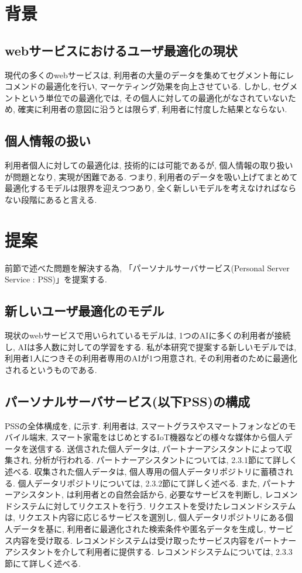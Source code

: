 \documentclass[a4j,twocolumn]{jsarticle}
\begin{document}
 
\twocolumn[\makeHeader]

\section{背景}
\subsection{webサービスにおけるユーザ最適化の現状}
現代の多くのwebサービスは, 利用者の大量のデータを集めてセグメント毎にレコメンドの最適化を行い, マーケティング効果を向上させている.
しかし, セグメントという単位での最適化では, その個人に対しての最適化がなされていないため, 確実に利用者の意図に沿うとは限らず, 利用者に忖度した結果とならない.

\subsection{個人情報の扱い}
利用者個人に対しての最適化は, 技術的には可能であるが, 個人情報の取り扱いが問題となり, 実現が困難である.
つまり, 利用者のデータを吸い上げてまとめて最適化するモデルは限界を迎えつつあり, 全く新しいモデルを考えなければならない段階にあると言える.


\section{提案}
前節で述べた問題を解決する為, 「パーソナルサーバサービス(Personal Server Service : PSS)」を提案する.

\subsection{新しいユーザ最適化のモデル} 
現状のwebサービスで用いられているモデルは, 1つのAIに多くの利用者が接続し, AIは多人数に対しての学習をする.
私が本研究で提案する新しいモデルでは, 利用者1人につきその利用者専用のAIが1つ用意され, その利用者のために最適化されるというものである.

\subsection{パーソナルサーバサービス(以下PSS)の構成}
PSSの全体構成を, に示す.
利用者は, スマートグラスやスマートフォンなどのモバイル端末, スマート家電をはじめとするIoT機器などの様々な媒体から個人データを送信する.
送信された個人データは, パートナーアシスタントによって収集され, 分析が行われる. パートナーアシスタントについては, 2.3.1節にて詳しく述べる.
収集された個人データは, 個人専用の個人データリポジトリに蓄積される. 個人データリポジトリについては, 2.3.2節にて詳しく述べる.
また, パートナーアシスタント, は利用者との自然会話から, 必要なサービスを判断し, レコメンドシステムに対してリクエストを行う.
リクエストを受けたレコメンドシステムは, リクエスト内容に応じるサービスを選別し, 個人データリポジトリにある個人データを基に, 利用者に最適化された検索条件や匿名データを生成し, サービス内容を受け取る.
レコメンドシステムは受け取ったサービス内容をパートナーアシスタントを介して利用者に提供する.
レコメンドシステムについては, 2.3.3節にて詳しく述べる.
\end{document}

